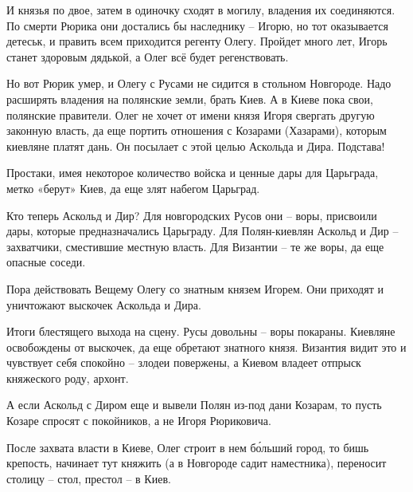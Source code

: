 И князья по двое, затем в одиночку сходят в могилу, владения их соединяются. По смерти Рюрика они достались бы наследнику – Игорю, но тот оказывается детеськ, и править всем приходится регенту Олегу. Пройдет много лет, Игорь станет здоровым дядькой, а Олег всё будет регенствовать.

Но вот Рюрик умер, и Олегу с Русами не сидится в стольном Новгороде. Надо расширять владения на полянские земли, брать Киев. А в Киеве пока свои, полянские правители. Олег не хочет от имени князя Игоря свергать другую законную власть, да еще портить отношения с Козарами (Хазарами), которым киевляне платят дань. Он посылает с этой целью Аскольда и Дира. Подстава!

Простаки, имея некоторое количество войска и ценные дары для Царьграда, метко «берут» Киев, да еще злят набегом Царьград.

Кто теперь Аскольд и Дир? Для новгородских Русов они – воры, присвоили дары, которые предназначались Царьграду. Для Полян-киевлян Аскольд и Дир – захватчики, сместившие местную власть. Для Византии – те же воры, да еще опасные соседи.

Пора действовать Вещему Олегу со знатным князем Игорем. Они приходят и уничтожают выскочек Аскольда и Дира.

Итоги блестящего выхода на сцену. Русы довольны – воры покараны. Киевляне освобождены от выскочек, да еще обретают знатного князя. Византия видит это и чувствует себя спокойно – злодеи повержены, а Киевом владеет отпрыск княжеского роду, архонт.

А если Аскольд с Диром еще и вывели Полян из-под дани Козарам, то пусть Козаре спросят с покойников, а не Игоря Рюриковича.

После захвата власти в Киеве, Олег строит в нем б\'ольший город, то бишь крепость, начинает тут княжить (а в Новгороде садит наместника), переносит столицу – стол, престол – в Киев.








